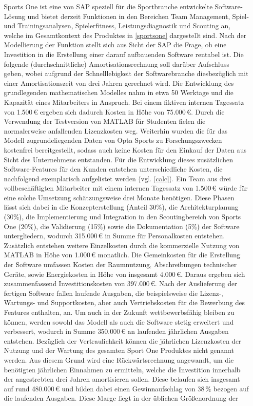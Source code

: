 Sports One ist eine von SAP speziell für die Sportbranche entwickelte Software-Lösung und bietet derzeit Funktionen in den Bereichen Team Management, Spiel- und Trainingsanalysen, Spielerfitness, Leistungsdiagnostik und Scouting an, welche im Gesamtkontext des Produktes in \vref{sportsone} dargestellt sind. Nach der Modellierung der Funktion stellt sich aus Sicht der SAP die Frage, ob eine Investition in die Erstellung einer darauf aufbauenden Software rentabel ist. Die folgende (durchschnittliche) Amortisationsrechnung soll darüber Aufschluss geben, wobei aufgrund der Schnelllebigkeit der Softwarebranche diesbezüglich mit einer Amortisationszeit von drei Jahren gerechnet wird. Die Entwicklung des grundlegenden mathematischen Modelles nahm in etwa 50 Werktage und die Kapazität eines Mitarbeiters in Anspruch. Bei einem fiktiven internen Tagessatz von \textsf{1.500\,\euro} ergeben sich dadurch Kosten in Höhe von \textsf{75.000\,\euro}. Durch die Verwendung der Testversion von MATLAB für Studenten fielen die normalerweise anfallenden Lizenzkosten weg. Weiterhin wurden die für das Modell zugrundeliegenden Daten von Opta Sports zu Forschungszwecken kostenfrei bereitgestellt, sodass auch keine Kosten für den Einkauf der Daten aus Sicht des Unternehmens entstanden. Für die Entwicklung dieses zusätzlichen Software-Features für den Kunden entstehen unterschiedliche Kosten, die nachfolgend exemplarisch aufgelistet werden (vgl. \vref{calc}). Ein Team aus drei vollbeschäftigten Mitarbeiter mit einem internen Tagessatz von \textsf{1.500\,\euro} würde für eine solche Umsetzung schätzungsweise drei Monate benötigen. Diese Phasen lässt sich dabei in die Konzepterstellung (Anteil 30\%), die Architekturplanung (30\%), die Implementierung und Integration in den Scoutingbereich von Sports One (20\%), die Validierung (15\%) sowie die Dokumentation (5\%) der Software untergliedern, wodurch \textsf{315.000\,\euro} in Summe für Personalkosten entstehen. Zusätzlich entstehen weitere Einzelkosten durch die kommerzielle Nutzung von MATLAB in Höhe von \textsf{1.000\,\euro} monatlich. Die Gemeinkosten für die Erstellung der Software umfassen Kosten der Raumnutzung, Abschreibungen technischer Geräte, sowie Energiekosten in Höhe von insgesamt \textsf{4.000\,\euro}. Daraus ergeben sich zusammenfassend Investitionskosten von \textsf{397.000\,\euro}. Nach der Auslieferung der fertigen Software fallen laufende Ausgaben, die beispielsweise die Lizenz-, Wartungs- und Supportkosten, aber auch Vertriebskosten für die Bewerbung des Features enthalten, an. Um auch in der Zukunft wettbewerbsfähig bleiben zu können, werden sowohl das Modell als auch die Software stetig erweitert und verbessert, wodurch in Summe \textsf{350.000\,\euro} an laufenden jährlichen Ausgaben entstehen. Bezüglich der Vertraulichkeit können die jährlichen Lizenzkosten der Nutzung und der Wartung des gesamten Sport One Produktes nicht genannt werden. Aus diesem Grund wird eine Rückwärtsrechnung angewandt, um die benötigten jährlichen Einnahmen zu ermitteln, welche die Investition innerhalb der angestrebten drei Jahren amortisieren sollen. Diese belaufen sich insgesamt auf rund \textsf{480.000\,\euro} und bilden dabei einen Gewinnaufschlag von \textsf{38\,\%} bezogen auf die laufenden Ausgaben. Diese Marge liegt in der üblichen Größenordnung der 
